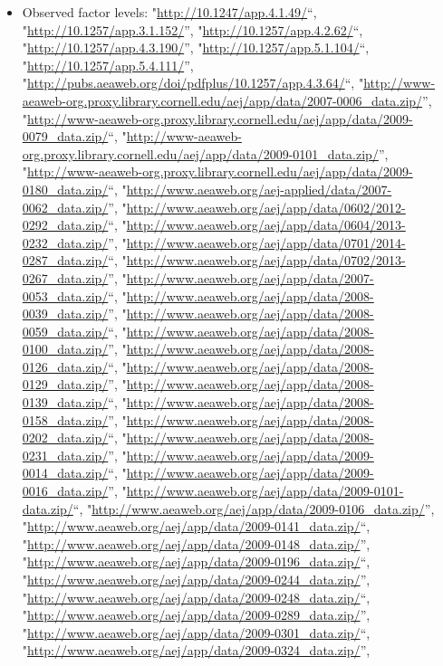 \documentclass[]{article}
\providecommand{\tightlist}{%
  \setlength{\itemsep}{0pt}\setlength{\parskip}{0pt}}
\begin{document}
\begin{itemize}
\tightlist
\item
  Observed factor levels: "\url{http://10.1247/app.4.1.49/}``,
  "\url{http://10.1257/app.3.1.152/}'',
  "\url{http://10.1257/app.4.2.62/}``,
  "\url{http://10.1257/app.4.3.190/}'',
  "\url{http://10.1257/app.5.1.104/}``,
  "\url{http://10.1257/app.5.4.111/}'',
  "\url{http://pubs.aeaweb.org/doi/pdfplus/10.1257/app.4.3.64/}``,
  "\url{http://www-aeaweb-org.proxy.library.cornell.edu/aej/app/data/2007-0006_data.zip/}'',
  "\url{http://www-aeaweb-org.proxy.library.cornell.edu/aej/app/data/2009-0079_data.zip/}``,
  "\url{http://www-aeaweb-org.proxy.library.cornell.edu/aej/app/data/2009-0101_data.zip/}'',
  "\url{http://www-aeaweb-org.proxy.library.cornell.edu/aej/app/data/2009-0180_data.zip/}``,
  "\url{http://www.aeaweb.org/aej-applied/data/2007-0062_data.zip/}'',
  "\url{http://www.aeaweb.org/aej/app/data/0602/2012-0292_data.zip/}``,
  "\url{http://www.aeaweb.org/aej/app/data/0604/2013-0232_data.zip/}'',
  "\url{http://www.aeaweb.org/aej/app/data/0701/2014-0287_data.zip/}``,
  "\url{http://www.aeaweb.org/aej/app/data/0702/2013-0267_data.zip/}'',
  "\url{http://www.aeaweb.org/aej/app/data/2007-0053_data.zip/}``,
  "\url{http://www.aeaweb.org/aej/app/data/2008-0039_data.zip/}'',
  "\url{http://www.aeaweb.org/aej/app/data/2008-0059_data.zip/}``,
  "\url{http://www.aeaweb.org/aej/app/data/2008-0100_data.zip/}'',
  "\url{http://www.aeaweb.org/aej/app/data/2008-0126_data.zip/}``,
  "\url{http://www.aeaweb.org/aej/app/data/2008-0129_data.zip/}'',
  "\url{http://www.aeaweb.org/aej/app/data/2008-0139_data.zip/}``,
  "\url{http://www.aeaweb.org/aej/app/data/2008-0158_data.zip/}'',
  "\url{http://www.aeaweb.org/aej/app/data/2008-0202_data.zip/}``,
  "\url{http://www.aeaweb.org/aej/app/data/2008-0231_data.zip/}'',
  "\url{http://www.aeaweb.org/aej/app/data/2009-0014_data.zip/}``,
  "\url{http://www.aeaweb.org/aej/app/data/2009-0016_data.zip/}'',
  "\url{http://www.aeaweb.org/aej/app/data/2009-0101-data.zip/}``,
  "\url{http://www.aeaweb.org/aej/app/data/2009-0106_data.zip/}'',
  "\url{http://www.aeaweb.org/aej/app/data/2009-0141_data.zip/}``,
  "\url{http://www.aeaweb.org/aej/app/data/2009-0148_data.zip/}'',
  "\url{http://www.aeaweb.org/aej/app/data/2009-0196_data.zip/}``,
  "\url{http://www.aeaweb.org/aej/app/data/2009-0244_data.zip/}'',
  "\url{http://www.aeaweb.org/aej/app/data/2009-0248_data.zip/}``,
  "\url{http://www.aeaweb.org/aej/app/data/2009-0289_data.zip/}'',
  "\url{http://www.aeaweb.org/aej/app/data/2009-0301_data.zip/}``,
  "\url{http://www.aeaweb.org/aej/app/data/2009-0324_data.zip/}'',

\end{itemize}
\end{document}
